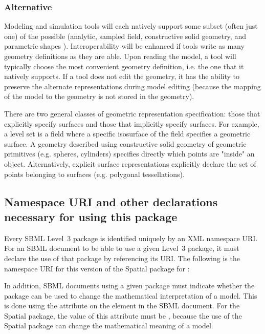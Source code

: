 \subsubsection{Alternative \GeometryDefinitions}
Modeling and simulation tools will each natively support some subset (often just one) of the possible \GeometryDefinitions (analytic, sampled field, constructive solid geometry, and parametric shapes ).  Interoperability will be enhanced if tools write as many geometry definitions as they are able.  Upon reading the model, a tool will typically choose the most convenient geometry definition, i.e. the one that it natively supports.  If a tool does not edit the geometry, it has the ability to preserve the alternate representations during model editing (because the mapping of the model to the geometry is not stored in the geometry).

There are two general classes of geometric representation specification: those that explicitly specify surfaces and those that implicitly specify surfaces.  For example, a level set is a field where a specific isosurface of the field specifies a geometric surface.  A geometry described using constructive solid geometry of geometric primitives (e.g. spheres, cylinders) specifies directly which points are "inside" an object.  Alternatively, explicit surface representations explicitly declare the set of points belonging to surfaces (e.g. polygonal tessellations).



\subsection{Namespace URI and other declarations necessary for using this package}
\label{xml-namespace}
Every SBML Level~3 package is identified uniquely by an XML namespace URI.  For an SBML document to be able to use a given Level~3 package, it must declare the use of that package by referencing its URI.  The following is the namespace URI for this version of the Spatial package for \sbmlthreecore:
\begin{center}
\end{center}

In addition, SBML documents using a given package must indicate whether the package can be used to change the mathematical interpretation of a model.  This is done using the attribute  on the  element in the SBML document.  For the Spatial package, the value of this attribute must be , because the use of the Spatial package can change the mathematical meaning of a model.


